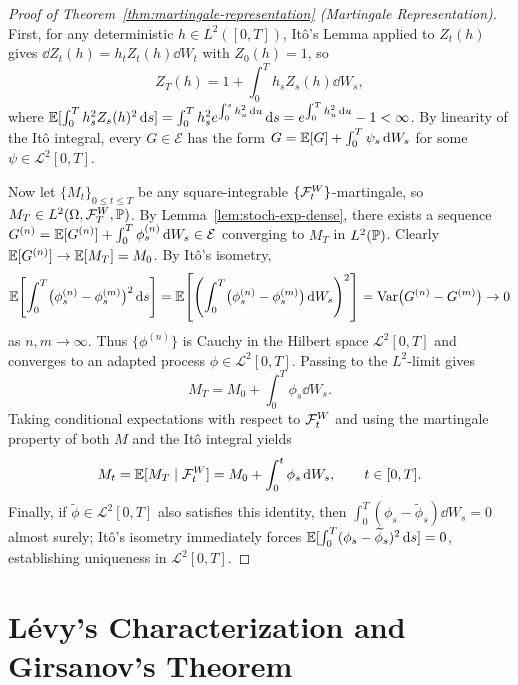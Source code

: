 \begin{proof}[Proof of Theorem~\ref{thm:martingale-representation} (Martingale Representation)]
    First, for any deterministic $h \in L^2([0, T])$, It\^o's Lemma applied to $Z_t(h)$ gives $\dd Z_t(h) = h_t Z_t(h)\dd W_t$ with $Z_0(h) = 1$, so
    \[
    Z_T(h) = 1 + \int_0^T h_s Z_s(h)\dd W_s,
    \]
    where $\mathbb{E}[\int_0^T h_s^2 Z_s(h)^2\,\mathrm{d} s] = \int_0^T h_s^2 e^{\int_0^s h_u^2\,\mathrm{d} u}\,\mathrm{d} s = e^{\int_0^T h_u^2\,\mathrm{d} u} - 1 < \infty$. By linearity of the It\^o integral, every $G \in \mathcal{E}$ has the form $G = \mathbb{E}[G] + \int_0^T \psi_s\,\mathrm{d} W_s$ for some $\psi \in \mathcal{L}^2[0, T]$.

    Now let $\{M_t\}_{0 \leq t \leq T}$ be any square-integrable $\{\mathcal{F}_t^W\}$-martingale, so $M_T \in L^2(\Omega, \mathcal{F}_T^W, \mathbb{P})$. By Lemma~\ref{lem:stoch-exp-dense}, there exists a sequence $G^{(n)} = \mathbb{E}[G^{(n)}] + \int_0^T \phi_s^{(n)}\,\mathrm{d} W_s \in \mathcal{E}$ converging to $M_T$ in $L^2(\mathbb{P})$. Clearly $\mathbb{E}[G^{(n)}] \to \mathbb{E}[M_T] = M_0$. By It\^o's isometry,
    \[
    \mathbb{E}\!\left[\int_0^T \bigl(\phi_s^{(n)} - \phi_s^{(m)}\bigr)^2 \,\mathrm{d} s\right]
    = \mathbb{E}\!\left[\left(\int_0^T \bigl(\phi_s^{(n)} - \phi_s^{(m)}\bigr)\,\mathrm{d} W_s\right)^2\right]
    = \operatorname{Var}\bigl(G^{(n)} - G^{(m)}\bigr) \to 0
    \]
    as $n, m \to \infty$. Thus $\{\phi^{(n)}\}$ is Cauchy in the Hilbert space $\mathcal{L}^2[0, T]$ and converges to an adapted process $\phi \in \mathcal{L}^2[0, T]$. Passing to the $L^2$-limit gives
    \[
    M_T = M_0 + \int_0^T \phi_s\dd W_s.
    \]
    Taking conditional expectations with respect to $\mathcal{F}_t^W$ and using the martingale property of both $M$ and the It\^o integral yields
    \[
    M_t = \mathbb{E}[M_T \mid \mathcal{F}_t^W] = M_0 + \int_0^t \phi_s\,\mathrm{d} W_s, \qquad t \in [0, T].
    \]
    Finally, if $\widetilde{\phi} \in \mathcal{L}^2[0, T]$ also satisfies this identity, then $\int_0^T (\phi_s - \widetilde{\phi}_s)\dd W_s = 0$ almost surely; It\^o's isometry immediately forces $\mathbb{E}[\int_0^T (\phi_s - \widetilde{\phi}_s)^2\,\mathrm{d} s] = 0$, establishing uniqueness in $\mathcal{L}^2[0, T]$.
\end{proof}

\section{L\'evy's Characterization and Girsanov's Theorem}\label{sec:proof-girsanov}

